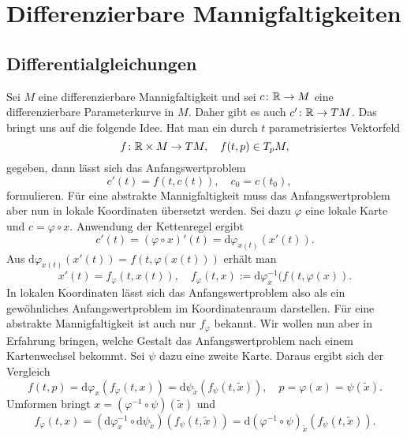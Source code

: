 
\chapter{Differenzierbare Mannigfaltigkeiten}

\section{Differentialgleichungen}

Sei $M$ eine differenzierbare Mannigfaltigkeit und sei $c\colon\mathbb R\to M$
eine differenzierbare Parameterkurve in $M$. Daher gibt es auch
$c'\colon\mathbb R\to TM$. Das bringt uns auf die folgende Idee. Hat man
ein durch $t$ parametrisiertes Vektorfeld
\begin{equation}
f\colon\mathbb R\times M\to TM,\quad f(t,p)\in T_p M,
\end{equation}
gegeben, dann lässt sich das Anfangswertproblem
\begin{equation}
c'(t) = f(t,c(t)),\quad c_0=c(t_0),\quad 
\end{equation}
formulieren. Für eine abstrakte Mannigfaltigkeit muss das
Anfangswertproblem aber nun in lokale Koordinaten übersetzt
werden. Sei dazu $\varphi$ eine lokale Karte und $c=\varphi\circ x$.
Anwendung der Kettenregel ergibt
\begin{equation}
c'(t) = (\varphi\circ x)'(t) = \mathrm d\varphi_{x(t)}(x'(t)).
\end{equation}
Aus $\mathrm d\varphi_{x(t)}(x'(t))=f(t,\varphi(x(t)))$ erhält man
\begin{equation}
x'(t) = f_\varphi(t,x(t)),\quad
f_\varphi(t,x):=\mathrm d\varphi_{x}^{-1}(f(t,\varphi(x)).
\end{equation}
In lokalen Koordinaten lässt sich das Anfangswertproblem also als
ein gewöhnliches Anfangswertproblem im Koordinatenraum darstellen.
Für eine abstrakte Mannigfaltigkeit ist auch nur $f_\varphi$ bekannt.
Wir wollen nun aber in Erfahrung bringen, welche Gestalt das
Anfangswertproblem nach einem Kartenwechsel bekommt. Sei $\psi$
dazu eine zweite Karte. Daraus ergibt sich der Vergleich
\begin{equation}
f(t,p)
= \mathrm d\varphi_x(f_\varphi(t,x))
= \mathrm d\psi_{\tilde x}(f_\psi(t,\tilde x)),\quad
p = \varphi(x) = \psi(\tilde x).
\end{equation}
Umformen bringt $x = (\varphi^{-1}\circ\psi)(\tilde x)$ und
\begin{equation}
f_\varphi(t,x) = (\mathrm d\varphi_x^{-1}\circ \mathrm d\psi_{\tilde x})(f_\psi(t,\tilde x))
= \mathrm d(\varphi^{-1}\circ \psi)_{\tilde x}(f_\psi(t,\tilde x)).
\end{equation}
